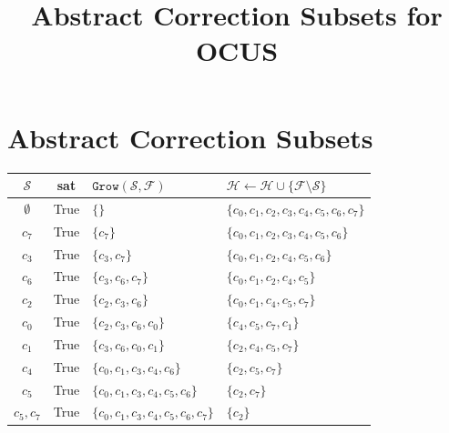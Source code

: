 \documentclass[11pt]{article}
\newcommand\m[1]{\mathcal{#1}}
\newcommand\setstohit{\ensuremath{\m{H} }\xspace}
\newcommand\formula{\ensuremath{\m{F} }\xspace}
\newcommand\mm[1]{\ensuremath{#1}\xspace}
\newcommand\call[1]{\mm{\texttt{#1}}}
\newcommand\grow{\mm{\call{Grow}}}
\begin{document}
	
	\title{Abstract Correction Subsets for OCUS}
	\date{}
	\author{}

	\section{Abstract Correction Subsets}
	\thispagestyle{empty}
	\begin{table}[!h]
		\centering
		\begin{tabular}{c|c|l|l}
	$\m{S}$ & sat & $\grow(\m{S}, \formula)$ & $\setstohit \gets \setstohit \cup \{\formula \setminus \m{S}\}$ \\\midrule
$\emptyset$                      & True & $\{\}$                                                     &$\{c_{0}, c_{1}, c_{2}, c_{3}, c_{4}, c_{5}, c_{6}, c_{7}\}$ \\
$c_{7}$                 & True & $\{c_{7}\}$                                                &$\{c_{0}, c_{1}, c_{2}, c_{3}, c_{4}, c_{5}, c_{6}\}$ \\
$c_{3}$                 & True & $\{c_{3}, c_{7}\}$                                         &$\{c_{0}, c_{1}, c_{2}, c_{4}, c_{5}, c_{6}\}$ \\
$c_{6}$                 & True & $\{c_{3}, c_{6}, c_{7}\}$                                  &$\{c_{0}, c_{1}, c_{2}, c_{4}, c_{5}\}$ \\
$c_{2}$                 & True & $\{c_{2}, c_{3}, c_{6}\}$                                  &$\{c_{0}, c_{1}, c_{4}, c_{5}, c_{7}\}$ \\
$c_{0}$                 & True & $\{c_{2}, c_{3}, c_{6}, c_{0}\}$                           &$\{c_{4}, c_{5}, c_{7}, c_{1}\}$ \\
$c_{1}$                 & True & $\{c_{3}, c_{6}, c_{0}, c_{1}\}$                           &$\{c_{2}, c_{4}, c_{5}, c_{7}\}$ \\
$c_{4}$                 & True & $\{c_{0}, c_{1}, c_{3}, c_{4}, c_{6}\}$                    &$\{c_{2}, c_{5}, c_{7}\}$ \\
$c_{5}$                 & True & $\{c_{0}, c_{1}, c_{3}, c_{4}, c_{5}, c_{6}\}$             &$\{c_{2}, c_{7}\}$ \\
$c_{5}, c_{7}$          & True & $\{c_{0}, c_{1}, c_{3}, c_{4}, c_{5}, c_{6}, c_{7}\}$      &$\{c_{2}\}$ \\

\end{tabular}
\end{table}
\end{document}
